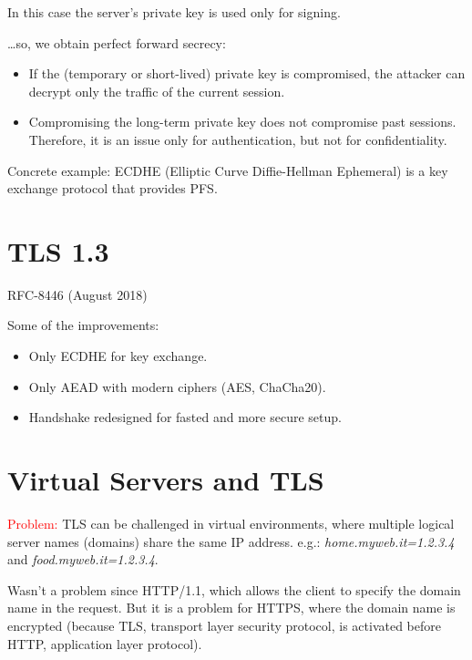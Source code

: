 \begin{tcolorbox}[colback=blue!10!white, colframe=blue!50!white]
    In this case the server's private key is used only for signing.
\end{tcolorbox}

\dots so, we obtain perfect forward secrecy:
\begin{itemize}
    \item If the (temporary or short-lived) private key is compromised, the attacker can decrypt only the traffic of the current session.
    \item Compromising the long-term private key does not compromise past sessions. Therefore, it is an issue only for authentication, but not for confidentiality.
\end{itemize}

Concrete example: ECDHE (Elliptic Curve Diffie-Hellman Ephemeral) is a key exchange protocol that provides PFS. 

\section{TLS 1.3}
\begin{center}
    RFC-8446 (August 2018)
\end{center}

Some of the improvements:
\begin{itemize}
    \item Only ECDHE for key exchange.
    \item Only AEAD with modern ciphers (AES, ChaCha20).
    \item Handshake redesigned for fasted and more secure setup.
\end{itemize}

\section{Virtual Servers and TLS}
\textcolor{red}{Problem: }TLS can be challenged in virtual environments, where multiple logical server names (domains) share the same IP address. e.g.: \textit{home.myweb.it=1.2.3.4} and \textit{food.myweb.it=1.2.3.4}.

Wasn't a problem since HTTP/1.1, which allows the client to specify the domain name in the request. But it is a problem for HTTPS, where the domain name is encrypted (because TLS, transport layer security protocol, is activated before HTTP, application layer protocol).

\vspace{0.2cm}

